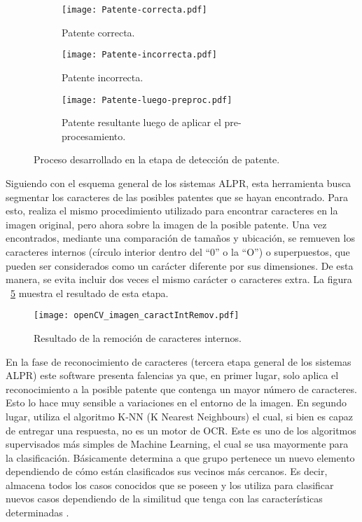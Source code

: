 \begin{figure}[H]
	\centering
	\begin{subfigure}[b]{0.49\textwidth}
		\texttt{[image: Patente-correcta.pdf]}
		\caption{Patente correcta.}
		\label{fig:img_patente-correcta}
	\end{subfigure}
	\hfill
	\begin{subfigure}[b]{0.49\textwidth}
		\texttt{[image: Patente-incorrecta.pdf]}
		\caption{Patente incorrecta.}
		\label{fig:img_patente-incorrecta}
	\end{subfigure}
	\hfill
	\begin{subfigure}[b]{0.49\textwidth}
		\texttt{[image: Patente-luego-preproc.pdf]}
		\caption{Patente resultante luego de aplicar el pre-procesamiento.}
		\label{fig:img_patente-luego-preproc}
	\end{subfigure}
	\caption{Proceso desarrollado en la etapa de detección de patente.}
\end{figure}

Siguiendo con el esquema general de los sistemas ALPR, esta herramienta busca segmentar los caracteres de las posibles patentes que se hayan encontrado. Para esto, realiza el mismo procedimiento utilizado para encontrar caracteres en la imagen original, pero ahora sobre la imagen de la posible patente. Una vez encontrados, mediante una comparación de tamaños y ubicación, se remueven los caracteres internos (círculo interior dentro del ``0'' o la ``O'') o superpuestos, que pueden ser considerados como un carácter diferente por sus dimensiones. De esta manera, se evita incluir dos veces el mismo carácter o caracteres extra. La figura ~\ref{fig:img_caract_remov_opencv} muestra el resultado de esta etapa.

\begin{figure}[H]
	\centering
	\texttt{[image: openCV\_imagen\_caractIntRemov.pdf]}
	\caption{Resultado de la remoción de caracteres internos.}
	\label{fig:img_caract_remov_opencv}
\end{figure}

En la fase de reconocimiento de caracteres (tercera etapa general de los sistemas ALPR) este software presenta falencias ya que, en primer lugar, solo aplica el reconocimiento a la posible patente que contenga un mayor número de caracteres. Esto lo hace muy sensible a variaciones en el entorno de la imagen. En segundo lugar, utiliza el algoritmo K-NN (K Nearest Neighbours) \cite{MEMORIA-ARCEARROYO}  el cual, si bien es capaz de entregar una respuesta, no es un motor de OCR. Este es uno de los algoritmos supervisados más simples de Machine Learning, el cual se usa mayormente para la clasificación. Básicamente determina a que grupo pertenece un nuevo elemento dependiendo de cómo están clasificados sus vecinos más cercanos. Es decir, almacena todos los casos conocidos que se poseen y los utiliza para clasificar nuevos casos dependiendo de la similitud que tenga con las características determinadas \cite{navacerrada}.

